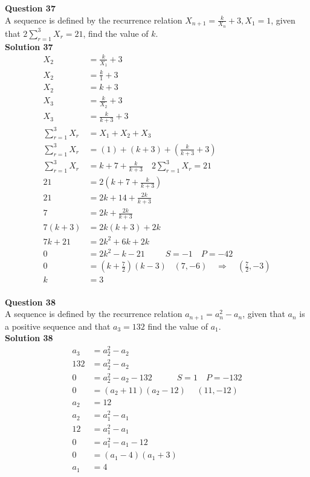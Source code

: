 \documentclass{article}
\begin{document}
\noindent\textbf{Question 37}\\[5pt]
A sequence is defined by the recurrence relation $X_{n+1}=\displaystyle\frac{k}{X_n}+3, X_1=1$, given that $2\displaystyle\sum_{r=1}^{3} X_r=21$, find the value of $k$.\\[5pt]
\noindent\textbf{Solution 37}\\[5pt]
\begin{align*}
X_2&=\displaystyle\frac{k}{X_1}+3\\[2pt]
X_2&=\displaystyle\frac{k}{1}+3\\[2pt]
X_2&=k+3\\[12pt]
X_3&=\displaystyle\frac{k}{X_2}+3\\[2pt]
X_3&=\displaystyle\frac{k}{k+3}+3\\[12pt]
\displaystyle\sum_{r=1}^{3} X_r&=X_1+X_2+X_3\\[2pt]
\displaystyle\sum_{r=1}^{3} X_r&=(1)+(k+3)+\left(\displaystyle\frac{k}{k+3}+3\right)\\[2pt]
\displaystyle\sum_{r=1}^{3} X_r&=k+7+\displaystyle\frac{k}{k+3}\quad 2\displaystyle\sum_{r=1}^{3} X_r=21\\[2pt]
21&=2\left(k+7+\displaystyle\frac{k}{k+3}\right)\\[2pt]
21&=2k+14+\displaystyle\frac{2k}{k+3}\\[2pt]
7&=2k+\displaystyle\frac{2k}{k+3}\\[2pt]
7(k+3)&=2k(k+3)+2k\\[2pt]
7k+21&=2k^2+6k+2k\\[2pt]
0&=2k^2-k-21\hspace{29pt}S=-1\quad P=-42\\[2pt]
0&=\left(k+\displaystyle\frac{7}{2}\right)(k-3)\hspace{10pt}(7,-6)\quad \Rightarrow \quad \left(\displaystyle\frac{7}{2},-3\right)\\[2pt]
k&=3
\end{align*}\\[10pt]

\noindent\textbf{Question 38}\\[5pt]
A sequence is defined by the recurrence relation $a_{n+1}=a_n^2-a_n$, given that $a_n$ is a positive sequence and that $a_3=132$ find the value of $a_1$.\\[5pt]
\noindent\textbf{Solution 38}\\[5pt]
\begin{align*}
a_3&=a_2^2-a_2\\[2pt]
132&=a_2^2-a_2\\[2pt]
0&=a_2^2-a_2-132 \hspace{35pt} S=1 \quad P=-132\\[2pt]
0&=(a_2+11)(a_2-12)\hspace{15pt} (11,-12)\\[2pt]
a_2&=12\\[12pt]
a_2&=a_1^2-a_1\\[2pt]
12&=a_1^2-a_1\\[2pt]
0&=a_1^2-a_1-12\\[2pt]
0&=(a_1-4)(a_1+3)\\[2pt]
a_1&=4
\end{align*}\\[10pt]
\end{document}
